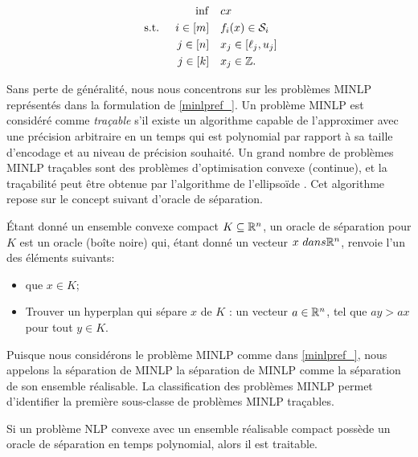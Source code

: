  \begin{subequations}
    \label{minlpref_}
    \begin{align}
       \inf &  \quad cx \label{minlpref_.obj} \\
    \textup{ s.t. } \quad i \in [m] & \quad f_i(x) \in \mathcal S_i  \label{minlpref_.consf} \\
      j \in [n] &  \quad x_j \in [\ell_j, u_j] \label{minlpref_.consfbd}\\
      j \in [k] & \quad x_j \in \mathbb Z. \label{minlpref_.consint}
    \end{align}
    \end{subequations}

    Sans perte de généralité, nous nous concentrons sur les problèmes MINLP représentés dans la formulation de \eqref{minlpref_}.
    Un problème MINLP est considéré comme \emph{traçable} s'il existe un algorithme capable de l'approximer avec une précision arbitraire en un temps qui est polynomial par rapport à sa taille d'encodage et au niveau de précision souhaité. 
    Un grand nombre de problèmes MINLP traçables sont des problèmes d'optimisation convexe (continue), et la traçabilité peut être obtenue par l'algorithme de l'ellipsoïde \cite{ecker1983ellipsoid}. Cet algorithme repose sur le concept suivant d'oracle de séparation.
    
    \begin{definition}
      Étant donné un ensemble convexe compact $K \subseteq \mathbb R^n$, un oracle de séparation pour $K$ est un oracle (boîte noire) qui, étant donné un vecteur $x\ dans \mathbb R^n$, renvoie l'un des éléments suivants:
      \begin{itemize}
          \item que $x \in K$;          
          \item Trouver un hyperplan qui sépare $x$ de $K$ : un vecteur $a \in \mathbb R^n$, tel que $a y > a x$ pour tout $y \in K$.
      \end{itemize}
    \end{definition} 
    
    Puisque nous considérons le problème MINLP comme dans \eqref{minlpref_}, nous appelons la séparation de MINLP
     la séparation de MINLP comme la séparation de son ensemble réalisable. La classification des problèmes MINLP permet d'identifier la première sous-classe de problèmes MINLP traçables.
    
    \begin{lemma}
    Si un problème NLP convexe avec un ensemble réalisable compact possède un oracle de séparation en temps polynomial, alors il est traitable.
    \end{lemma}




